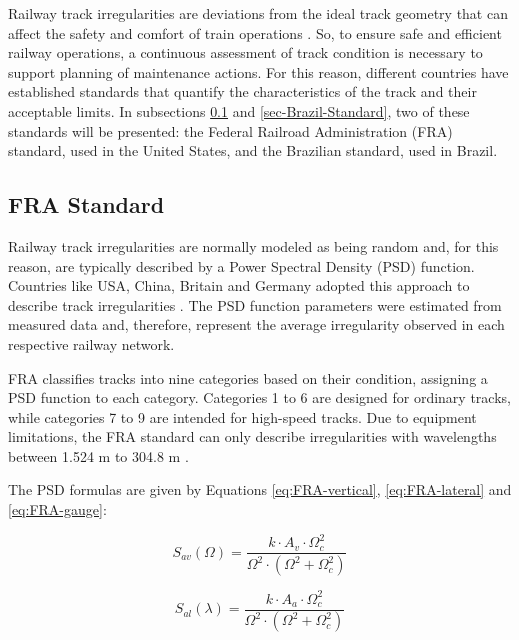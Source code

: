 Railway track irregularities are deviations from the ideal track geometry that can affect the safety and comfort of train operations \cite{Sansinena26032025}. So, to ensure safe and efficient railway operations, a continuous assessment of track condition is necessary to support planning of maintenance actions. For this reason, different countries have established standards that quantify the characteristics of the track and their acceptable limits. In subsections \ref{sec-FRA-Standard} and \ref{sec-Brazil-Standard}, two of these standards will be presented: the Federal Railroad Administration (FRA) standard, used in the United States, and the Brazilian standard, used in Brazil.

\subsection{FRA Standard} \label{sec-FRA-Standard}

Railway track irregularities are normally modeled as being random and, for this reason, are typically described by a Power Spectral Density (PSD) function. Countries like USA, China, Britain and Germany adopted this approach to describe track irregularities \cite{PIRES2021107806,Berawi2013ImprovingRT}. The PSD function parameters were estimated from measured data and, therefore, represent the average irregularity observed in each respective railway network.

FRA classifies tracks into nine categories based on their condition, assigning a PSD function to each category. Categories 1 to 6 are designed for ordinary tracks, while categories 7 to 9 are intended for high-speed tracks. Due to equipment limitations, the FRA standard can only describe irregularities with wavelengths between 1.524 m to 304.8 m \cite{Berawi2013ImprovingRT}.

The PSD formulas are given by Equations \ref{eq:FRA-vertical}, \ref{eq:FRA-lateral} and \ref{eq:FRA-gauge}:

\begin{equation}
    S_{av}(\Omega) = \frac{k \cdot A_v \cdot \Omega_c^2}{\Omega^2 \cdot \left(\Omega^2 + \Omega_c^2\right)}
    \label{eq:FRA-vertical}
\end{equation}

\begin{equation}
    S_{al}(\lambda) = \frac{k \cdot A_a \cdot \Omega_c^2}{\Omega^2 \cdot \left(\Omega^2 + \Omega_c^2\right)}
    \label{eq:FRA-lateral}
\end{equation}


